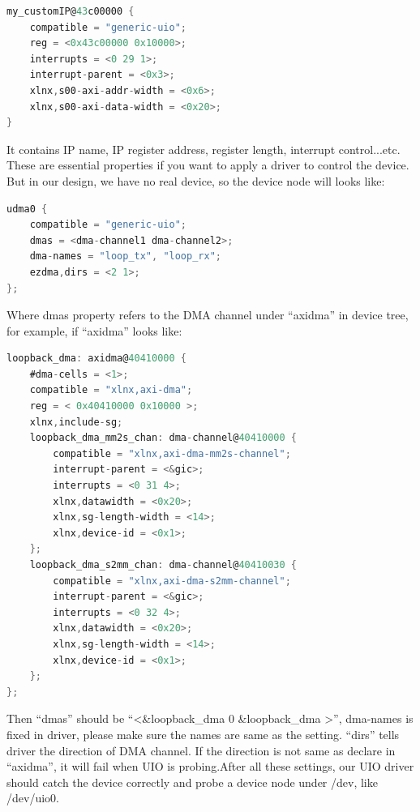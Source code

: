 {\renewcommand\baselinestretch{0.8}\selectfont
\begin{lstlisting}[frame=single,language=C]
my_customIP@43c00000 {
	compatible = "generic-uio";
	reg = <0x43c00000 0x10000>;
	interrupts = <0 29 1>;
	interrupt-parent = <0x3>;
	xlnx,s00-axi-addr-width = <0x6>;
	xlnx,s00-axi-data-width = <0x20>;
}
\end{lstlisting}
\par}

It contains IP name, IP register address, register length, interrupt control...etc. These are essential properties if you want to apply a driver to control the device. But in our design, we have no real device, so the device node will looks like:

{\renewcommand\baselinestretch{0.8}\selectfont
\begin{lstlisting}[frame=single,language=C]
udma0 {
    compatible = "generic-uio";
    dmas = <dma-channel1 dma-channel2>;
    dma-names = "loop_tx", "loop_rx";   
    ezdma,dirs = <2 1>;                 
};
\end{lstlisting}
\par}

Where dmas property refers to the DMA channel under ``axidma'' in device tree, for example, if ``axidma'' looks like:

{\renewcommand\baselinestretch{0.8}\selectfont
\begin{lstlisting}[frame=single,language=C]
loopback_dma: axidma@40410000 {
    #dma-cells = <1>;
    compatible = "xlnx,axi-dma";
    reg = < 0x40410000 0x10000 >;
    xlnx,include-sg;
    loopback_dma_mm2s_chan: dma-channel@40410000 {
        compatible = "xlnx,axi-dma-mm2s-channel";
        interrupt-parent = <&gic>;
        interrupts = <0 31 4>; 
        xlnx,datawidth = <0x20>;        
        xlnx,sg-length-width = <14>;    
        xlnx,device-id = <0x1>;     
    };
	loopback_dma_s2mm_chan: dma-channel@40410030 {
        compatible = "xlnx,axi-dma-s2mm-channel";
        interrupt-parent = <&gic>;
        interrupts = <0 32 4>;  
        xlnx,datawidth = <0x20>;       
        xlnx,sg-length-width = <14>;    
        xlnx,device-id = <0x1>;    
    };
};
\end{lstlisting}
\par}

Then ``dmas'' should be ``<\&loopback\_dma 0 \&loopback\_dma >'', dma-names is fixed in driver, please make sure the names are same as the setting. ``dirs'' tells driver the direction of DMA channel. If the direction is not same as declare in ``axidma'', it will fail when UIO is probing.After all these settings, our UIO driver should catch the device correctly and probe a device node under /dev, like /dev/uio0.

